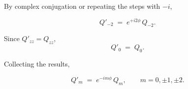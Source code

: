 By complex conjugation or repeating the steps with $-i$,

\begin{equation}
Q'_{-2} \;=\; e^{+i2\phi}\,Q_{-2}.
\end{equation}

Since $Q'_{zz}=Q_{zz}$,
\begin{equation}
Q'_0 \;=\; Q_0.
\end{equation}

Collecting the results,

\begin{equation}
Q'_m \;=\; e^{-im\phi}\,Q_m,\qquad m=0,\pm1,\pm2.
\end{equation}

